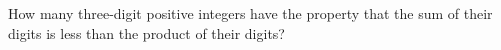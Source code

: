 How many three-digit positive integers have the property that the sum of their digits is less than the product of their digits?
